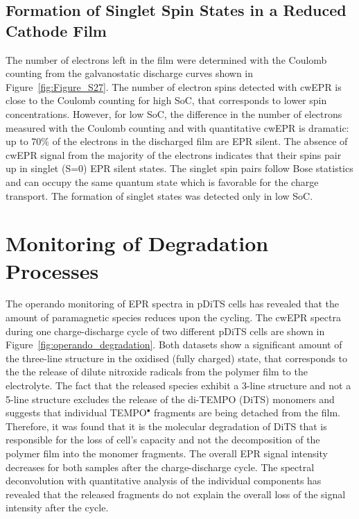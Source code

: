\subsection{Formation of Singlet Spin States in a Reduced Cathode Film}
The number of electrons left in the film were determined with the Coulomb counting from the galvanostatic discharge curves shown in Figure~\ref{fig:Figure_S27}. The number of electron spins detected with cwEPR is close to the Coulomb counting for high SoC, that corresponds to lower spin concentrations. However, for low SoC, the difference in the number of electrons measured with the Coulomb counting and with quantitative cwEPR is dramatic: up to 70\% of the electrons in the discharged film are EPR silent. The absence of cwEPR signal from the majority of the electrons indicates that their spins pair up in singlet (S=0) EPR silent states. The singlet spin pairs follow Bose statistics and can occupy the same quantum state which is favorable for the charge transport. The formation of singlet states was detected only in low SoC.

\section{Monitoring of Degradation Processes}
The operando monitoring of EPR spectra in pDiTS cells has revealed that the amount of paramagnetic species reduces upon the cycling. The cwEPR spectra during one charge-discharge cycle of two different pDiTS cells are shown in Figure~\ref{fig:operando_degradation}. Both datasets show a significant amount of the three-line structure in the oxidised (fully charged) state, that corresponds to the the release of dilute nitroxide radicals from the polymer film to the electrolyte. The fact that the released species exhibit a 3-line structure and not a 5-line structure excludes the release of the di-TEMPO (DiTS) monomers and suggests that individual TEMPO$^{\bullet}$ fragments are being detached from the film. Therefore, it was found that it is the molecular degradation of DiTS that is responsible for the loss of cell's capacity and not the decomposition of the polymer film into the monomer fragments. The overall EPR signal intensity decreases for both samples after the charge-discharge cycle. The spectral deconvolution with quantitative analysis of the individual components has revealed that the released fragments do not explain the overall loss of the signal intensity after the cycle.\\



